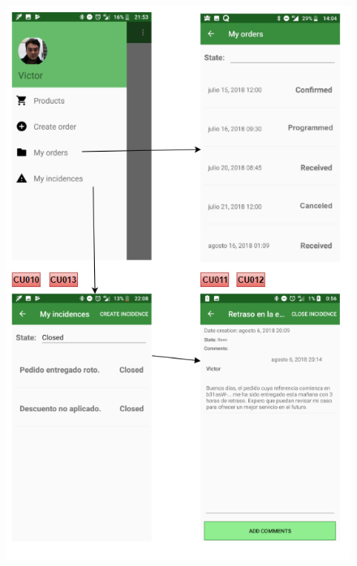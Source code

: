 \documentclass[11pt,spanish,listoffigures]{tfgetsinf}
\begin{document}
\begin{figure}[h]
\centering
\includegraphics[scale=1.2]{ModeloUI_Final2}
\end{figure}
\end{document}
